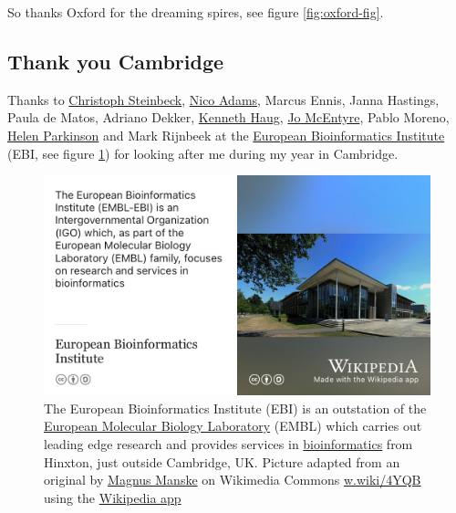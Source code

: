 \documentclass[
]{book}
\begin{document}
So thanks Oxford for the dreaming spires, see figure \ref{fig:oxford-fig}. 🙏

\hypertarget{cambridge}{%
\subsection{Thank you Cambridge}\label{cambridge}}

Thanks to \href{https://en.wikipedia.org/wiki/Christoph_Steinbeck}{Christoph Steinbeck}, \href{https://scholar.google.com/citations?user=3-PcEsEAAAAJ}{Nico Adams}, Marcus Ennis, Janna Hastings, Paula de Matos, Adriano Dekker, \href{https://twitter.com/kennethhaug}{Kenneth Haug}, \href{https://twitter.com/jomcentyre}{Jo McEntyre}, Pablo Moreno, \href{https://twitter.com/drp_stuff}{Helen Parkinson} and Mark Rijnbeek at the \href{https://en.wikipedia.org/wiki/European_Bioinformatics_Institute}{European Bioinformatics Institute} (EBI, see figure \ref{fig:cambridge-fig}) for looking after me during my year in Cambridge.

\begin{figure}

{\centering \includegraphics[width=1\linewidth]{images/european-bioinformatics-institute} 

}

\caption{The European Bioinformatics Institute (EBI) is an outstation of the \href{https://en.wikipedia.org/wiki/European_Molecular_Biology_Laboratory}{European Molecular Biology Laboratory} (EMBL) which carries out leading edge research and provides services in \href{https://en.wikipedia.org/wiki/Bioinformatics}{bioinformatics} from Hinxton, just outside Cambridge, UK. Picture adapted from an original by \href{https://en.wikipedia.org/wiki/Magnus_Manske}{Magnus Manske} on Wikimedia Commons \href{https://w.wiki/4YQB}{w.wiki/4YQB} using the \href{https://apps.apple.com/us/app/wikipedia/id324715238}{Wikipedia app}}\label{fig:cambridge-fig}
\end{figure}
\end{document}
